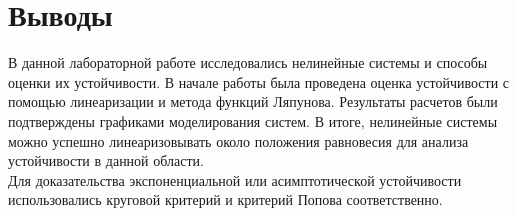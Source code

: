 \documentclass[12pt]{article}
\begin{document}
\section*{Выводы}
В данной лабораторной работе исследовались нелинейные системы и способы оценки их устойчивости. В начале работы была проведена оценка устойчивости с помощью линеаризации и метода функций Ляпунова. Результаты расчетов были подтверждены графиками моделирования систем. В итоге, нелинейные системы можно успешно линеаризовывать около положения равновесия для анализа устойчивости в данной области.\\
Для доказательства экспоненциальной или асимптотической устойчивости использовались круговой критерий и критерий Попова соответственно. 
\end{document}
